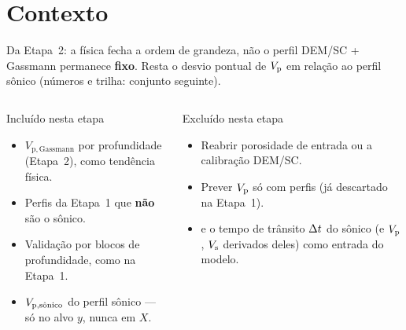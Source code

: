 \documentclass[aspectratio=169,10pt]{beamer}
\begin{document}
\section{Contexto}

\begin{frame}[shrink=10]{Da Etapa~2: a física fecha a ordem de grandeza, não o perfil}
  \footnotesize
  DEM/SC + Gassmann permanece \textbf{fixo}. Resta o desvio pontual de $\Vp$
  em relação ao perfil sônico (números e trilha: conjunto seguinte).
  \begin{columns}[T,onlytextwidth]
    \begin{block}{Incluído nesta etapa}
      \scriptsize
      \begin{itemize}
        \item $V_{\mathrm{p,Gassmann}}$ por profundidade (Etapa~2), como
              tendência física.
        \item Perfis da Etapa~1 que \textbf{não} são o sônico.
        \item Validação por blocos de profundidade, como na Etapa~1.
        \item $\Vpsonsub$ do perfil sônico --- só no alvo $y$, nunca em $X$.
      \end{itemize}
    \end{block}
    \begin{exampleblock}{Excluído nesta etapa}
      \scriptsize
      \begin{itemize}
        \item Reabrir porosidade de entrada ou a calibração DEM/SC.
        \item Prever $\Vp$ só com perfis (já descartado na Etapa~1).
        \item \phiS{} e o tempo de trânsito $\Dt$ do sônico (e $\Vp$, $\Vs$
              derivados deles) como entrada do modelo.
      \end{itemize}
    \end{exampleblock}
    \centering
\end{columns}
\end{frame}
\end{document}
